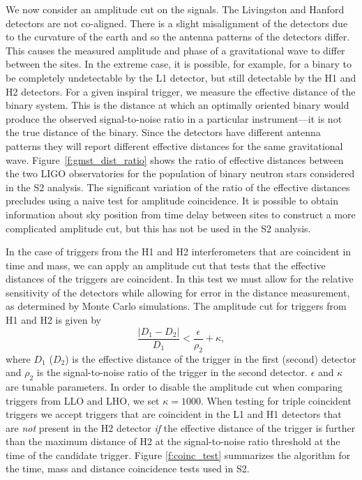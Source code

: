 We now consider an amplitude cut on the signals. The Livingston and Hanford
detectors are not co-aligned. There is a slight misalignment of the detectors
due to the curvature of the earth and so the antenna patterns of the detectors
differ. This causes the measured amplitude and phase of a gravitational wave
to differ between the sites. In the extreme case, it is possible, for example,
for a binary to be completely undetectable by the L1 detector, but still
detectable by the H1 and H2 detectors. For a given inspiral trigger, we
measure the effective distance of the binary system. This is the distance at
which an optimally oriented binary would produce the observed signal-to-noise
ratio in a particular instrument---it is not the true distance of the binary.
Since the detectors have different antenna patterns they will report different
effective distances for the same gravitational wave.
Figure~\ref{f:gmst_dist_ratio} shows the ratio of effective distances between
the two LIGO observatories for the population of binary neutron stars
considered in the S2 analysis. The significant variation of the ratio of the
effective distances precludes using a naive test for amplitude coincidence. It
is possible to obtain information about sky position from time delay between
sites to construct a more complicated amplitude cut, but this has not be used
in the S2 analysis.

In the case of triggers from the H1 and H2 interferometers that are coincident
in time and mass, we can apply an amplitude cut that tests that the effective
distances of the triggers are coincident.  In this test we must allow for the
relative sensitivity of the detectors while allowing for error in the distance
measurement, as determined by Monte Carlo simulations. The amplitude cut for
triggers from H1 and H2 is given by 
\begin{equation}
\label{eq:eff_dist_test}
\frac{\left|D_\mathrm{1} - D_\mathrm{2}\right|}{D_\mathrm{1}}
< \frac{\epsilon}{\rho_\mathrm{2}} + \kappa,
\end{equation}
where $D_1$ ($D_2$) is the effective distance of the trigger in the first
(second) detector and $\rho_{2}$ is the signal-to-noise ratio of the trigger
in the second detector. $\epsilon$ and $\kappa$ are tunable parameters.
In order to disable the amplitude cut when comparing triggers from LLO and
LHO, we set $\kappa = 1000$.  When testing for triple coincident triggers we
accept triggers that are coincident in the L1 and H1 detectors that are
\emph{not} present in the H2 detector \emph{if} the effective distance of the
trigger is further than the maximum distance of H2 at the signal-to-noise
ratio threshold at the time of the candidate trigger.  Figure
\ref{f:coinc_test} summarizes the algorithm for the time, mass and distance
coincidence tests used in S2. 

